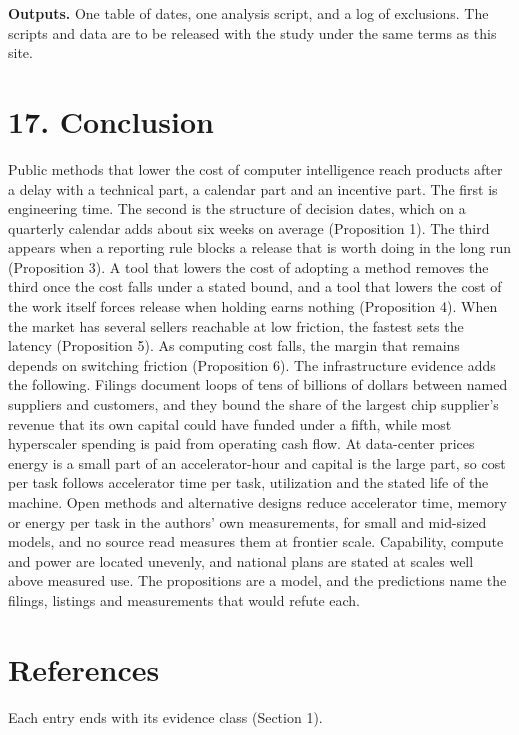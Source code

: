 \documentclass[10pt,letterpaper]{article}
\begin{document}
\textbf{Outputs.} One table of dates, one analysis script, and a log of
exclusions. The scripts and data are to be released with the study under
the same terms as this site.

\section{17. Conclusion}\label{conclusion}

Public methods that lower the cost of computer intelligence reach
products after a delay with a technical part, a calendar part and an
incentive part. The first is engineering time. The second is the
structure of decision dates, which on a quarterly calendar adds about
six weeks on average (Proposition 1). The third appears when a reporting
rule blocks a release that is worth doing in the long run (Proposition
3). A tool that lowers the cost of adopting a method removes the third
once the cost falls under a stated bound, and a tool that lowers the
cost of the work itself forces release when holding earns nothing
(Proposition 4). When the market has several sellers reachable at low
friction, the fastest sets the latency (Proposition 5). As computing
cost falls, the margin that remains depends on switching friction
(Proposition 6). The infrastructure evidence adds the following. Filings
document loops of tens of billions of dollars between named suppliers
and customers, and they bound the share of the largest chip supplier's
revenue that its own capital could have funded under a fifth, while most
hyperscaler spending is paid from operating cash flow. At data-center
prices energy is a small part of an accelerator-hour and capital is the
large part, so cost per task follows accelerator time per task,
utilization and the stated life of the machine. Open methods and
alternative designs reduce accelerator time, memory or energy per task
in the authors' own measurements, for small and mid-sized models, and no
source read measures them at frontier scale. Capability, compute and
power are located unevenly, and national plans are stated at scales well
above measured use. The propositions are a model, and the predictions
name the filings, listings and measurements that would refute each.

\section{References}\label{references}

Each entry ends with its evidence class (Section 1).
\end{document}
